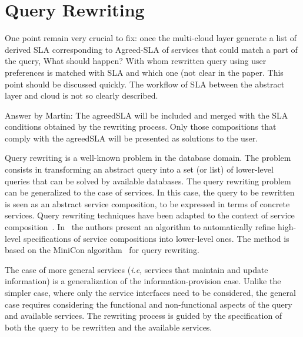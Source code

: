  
 
\section{Query Rewriting}
\label{sec:queryRew}

\color{red}
One point remain very crucial to fix: once the multi-cloud layer generate a list of derived SLA corresponding to Agreed-SLA of services that could match a part of the query, What should happen?  With whom rewritten query using user preferences is matched with SLA and which one (not clear in the paper.  This point should be discussed quickly. The workflow of SLA between the abstract layer and cloud is not so clearly described.

\color{green}
Answer by Martin: The agreedSLA will be included and merged with the SLA conditions obtained by the rewriting process. Only those compositions that comply with the agreedSLA will be presented as solutions to the user.
 
\color{black}
Query rewriting is a well-known problem in the database domain.
The problem consists in transforming an abstract query into a set (or list) of lower-level queries that can be solved by  available databases.
The query rewriting problem can be generalized to the case of services.
In this case, the query to be rewritten is seen as an abstract service composition, to be expressed in terms of concrete services.
Query rewriting techniques have been adapted to the context of service composition~\cite{BBM10,ZLC11,CostaAMR13}. 
In~\cite{CostaAMR13} the authors present an algorithm to automatically refine high-level specifications of service compositions into lower-level ones. 
The method is based on the MiniCon algorithm~\cite{PH01} for query rewriting.

The case of more general services (\textit{i.e}, services that maintain and update information) is a generalization of the information-provision case.
Unlike the simpler case, where only the service interfaces need to be considered, the general case requires considering the functional and non-functional aspects of the query and available services.
The rewriting process is guided by the specification of both the query to be rewritten and the available services.


